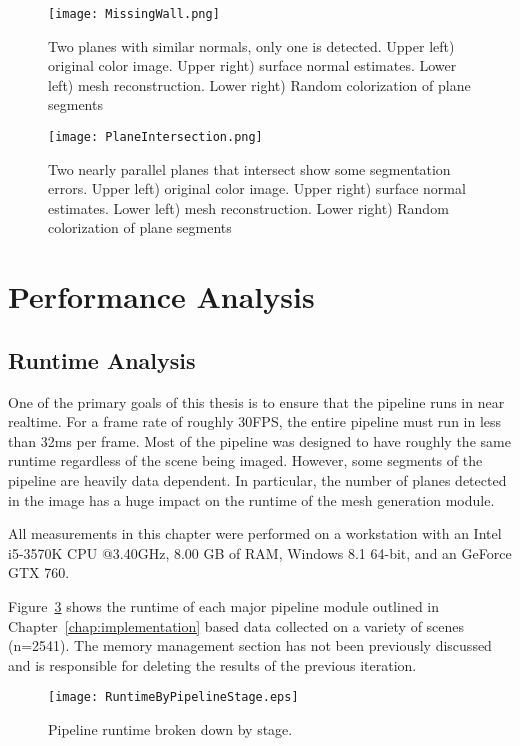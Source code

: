 \begin{figure}[!htpb]
    \centering
    \texttt{[image: MissingWall.png]}
    \caption{Two planes with similar normals, only one is detected. Upper left) original color image. Upper right) surface normal estimates. Lower left) mesh reconstruction. Lower right) Random colorization of plane segments}
    \label{fig:missingwall}
\end{figure}



\begin{figure}[!htpb]
    \centering
    \texttt{[image: PlaneIntersection.png]}
    \caption{Two nearly parallel planes that intersect show some segmentation errors. Upper left) original color image. Upper right) surface normal estimates. Lower left) mesh reconstruction. Lower right) Random colorization of plane segments}
    \label{fig:planeintersect}
\end{figure}



\section{Performance Analysis}
\subsection{Runtime Analysis}
One of the primary goals of this thesis is to ensure that the pipeline runs in near realtime. For a frame rate of roughly 30FPS, the entire pipeline must run in less than 32ms per frame. Most of the pipeline was designed to  have roughly the same runtime regardless of the scene being imaged. However, some segments of the pipeline are heavily data dependent. In particular, the number of planes detected in the image has a huge impact on the runtime of the mesh generation module.\par 

All measurements in this chapter were performed on a workstation with an Intel i5-3570K CPU @3.40GHz, 8.00 GB of RAM, Windows 8.1 64-bit, and an GeForce GTX 760. \par 
Figure~\ref{fig:runtimebystage} shows the runtime of each major pipeline module outlined in Chapter~\ref{chap:implementation} based data collected on a variety of scenes (n=2541). The memory management section has not been previously discussed and is responsible for deleting the results of the previous iteration. 

\begin{figure}[!htpb]
    \centering
    \texttt{[image: RuntimeByPipelineStage.eps]}
    \caption{Pipeline runtime broken down by stage.}
    \label{fig:runtimebystage}
\end{figure}

